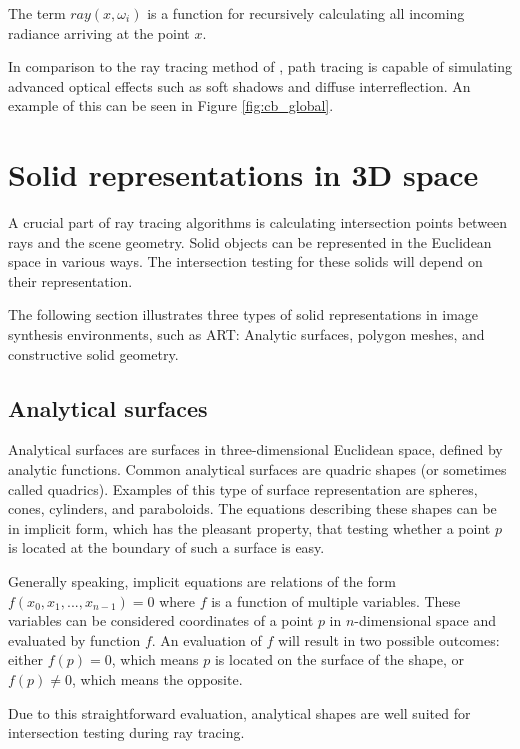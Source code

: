The term $ray(x, \omega_{i})$ is a function for recursively calculating all incoming radiance arriving at the point $x$.

In comparison to the ray tracing method of \cite{whitted1979improved}, path tracing is capable of simulating advanced optical effects such as soft shadows and diffuse interreflection. An example of this can be seen in Figure \ref{fig:cb_global}.

\section{Solid representations in 3D space}

A crucial part of ray tracing algorithms is calculating intersection points between rays and the scene geometry.
Solid objects can be represented in the Euclidean space in various ways. The intersection testing for these solids will depend on their representation.

The following section illustrates three types of solid representations in image synthesis environments, such as ART: Analytic surfaces, polygon meshes, and constructive solid geometry.

\subsection{Analytical surfaces}
\label{sec:quadrics}
Analytical surfaces are surfaces in three-dimensional Euclidean space, defined by analytic functions. Common analytical surfaces are quadric shapes (or sometimes called quadrics). Examples of this type of surface representation are spheres, cones, cylinders, and paraboloids. The equations describing these shapes can be in implicit form, which has the pleasant property, that testing whether a point $p$ is located at the boundary of such a surface is easy. 

Generally speaking, implicit equations are relations of the form \\  $f(x_{0}, x_{1}, ..., x_{n-1}) = 0$ where $f$ is a function of multiple variables. These variables can be considered coordinates of a point $p$ in $n$-dimensional space and evaluated by function $f$. An evaluation of $f$ will result in two possible outcomes: either $f(p) = 0$, which means $p$ is located on the surface of the shape, or  $f(p) \ne 0$, which means the opposite.

Due to this straightforward evaluation, analytical shapes are well suited for intersection testing during ray tracing.

